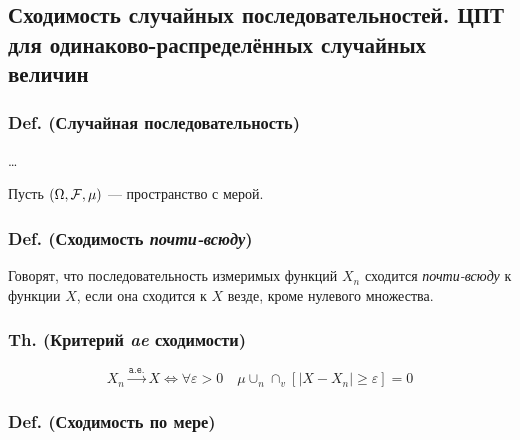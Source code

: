 \subsection{Сходимость случайных последовательностей. ЦПТ для
одинаково-распределённых случайных
величин}\label{ux441ux445ux43eux434ux438ux43cux43eux441ux442ux44c-ux441ux43bux443ux447ux430ux439ux43dux44bux445-ux43fux43eux441ux43bux435ux434ux43eux432ux430ux442ux435ux43bux44cux43dux43eux441ux442ux435ux439.-ux446ux43fux442-ux434ux43bux44f-ux43eux434ux438ux43dux430ux43aux43eux432ux43e-ux440ux430ux441ux43fux440ux435ux434ux435ux43bux451ux43dux43dux44bux445-ux441ux43bux443ux447ux430ux439ux43dux44bux445-ux432ux435ux43bux438ux447ux438ux43d}

\subsubsection{Def. (Случайная
последовательность)}\label{def.-ux441ux43bux443ux447ux430ux439ux43dux430ux44f-ux43fux43eux441ux43bux435ux434ux43eux432ux430ux442ux435ux43bux44cux43dux43eux441ux442ux44c}

\ldots{}

Пусть \((\Omega, \mathcal F, \mu)\) --- пространство с мерой.

\subsubsection{\texorpdfstring{Def. (Сходимость
\emph{почти-всюду})}{Def. (Сходимость почти-всюду)}}\label{def.-ux441ux445ux43eux434ux438ux43cux43eux441ux442ux44c-ux43fux43eux447ux442ux438-ux432ux441ux44eux434ux443}

Говорят, что последовательность измеримых функций \(X_n\) сходится
\emph{почти-всюду} к функции \(X\), если она сходится к \(X\) везде,
кроме нулевого множества.

\subsubsection{\texorpdfstring{Th. (Критерий \emph{ae}
сходимости)}{Th. (Критерий ae сходимости)}}\label{th.-ux43aux440ux438ux442ux435ux440ux438ux439-ae-ux441ux445ux43eux434ux438ux43cux43eux441ux442ux438}

\[X_n \xrightarrow{\texttt{a.e.}} X \iff \forall\varepsilon > 0 \quad \mu \cup_n\cap_v \left[{ \left|{X-X_n}\right|\geq\varepsilon }\right] = 0 \]

\subsubsection{Def. (Сходимость по
мере)}\label{def.-ux441ux445ux43eux434ux438ux43cux43eux441ux442ux44c-ux43fux43e-ux43cux435ux440ux435}

